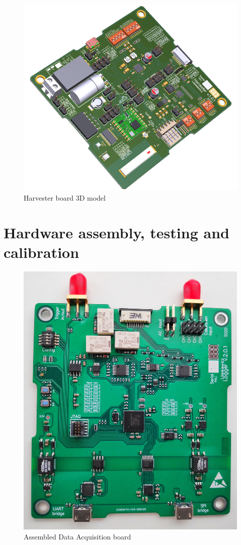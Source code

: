 \documentclass[12pt,a4paper]{article}
\begin{document}
\begin{figure}[ht!]
\includegraphics[scale=0.75]{harvester2.png}
\caption{Harvester board 3D model}
\label{fig:harvester3d}
\end{figure}

\section{Hardware assembly, testing and calibration}

\begin{figure}[ht!]
\includegraphics[scale=0.17]{logger.jpg}
\caption{Assembled Data Acquisition board}
\label{fig:loggerreal}
\end{figure}
\end{document}
